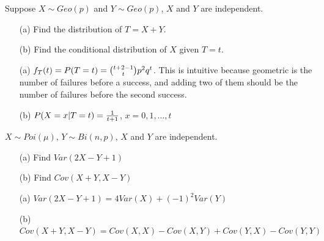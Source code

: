 \documentclass[english, 11pt]{article}
\begin{document}
  \begin{exmp}
    Suppose $X \sim Geo(p)$ and $Y \sim Geo(p)$, $X$ and $Y$ are independent.
    \begin{itemize}
      \item[(a)] Find the distribution of $T = X + Y$.
      \item[(b)] Find the conditional distribution of $X$ given $T = t$.
    \end{itemize}

    \begin{itemize}
      \item[(a)] $f_T(t) = P(T = t) = {t+2-1 \choose t}p^2q^t$. This is intuitive because geometric is the number of failures before a success, and adding two of them should be the number of failures before the second success.
      \item[(b)] $P(X=x|T=t) = \frac{1}{t+1}$, $x = 0,1,\ldots,t$
    \end{itemize}
  \end{exmp}

  \begin{exmp}
    $X \sim Poi(\mu)$, $Y \sim Bi(n,p)$, $X$ and $Y$ are independent.
    \begin{itemize}
      \item[(a)] Find $Var(2X - Y + 1)$
      \item[(b)] Find $Cov(X + Y, X - Y)$
    \end{itemize}

    \begin{itemize}
      \item[(a)] $Var(2X-Y+1) = 4Var(X) + (-1)^2 Var(Y)$
      \item[(b)] $Cov(X + Y, X-Y) = Cov(X,X) - Cov(X,Y) + Cov(Y,X) - Cov(Y,Y)$
    \end{itemize}
  \end{exmp}
\end{document}
